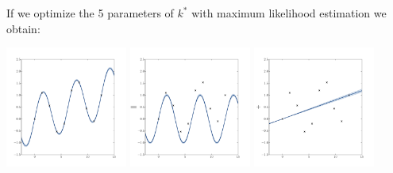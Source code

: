 \documentclass{beamer}
\begin{document}
\begin{frame}{}
If we optimize the 5 parameters of $k^*$ with maximum likelihood estimation we obtain: 
\begin{center}
 \includegraphics[height=4cm]{figures/Fig2-m-estim} \includegraphics[height=4cm]{figures/Fig2-mp-estim-top} \includegraphics[height=4cm]{figures/Fig2-ma-estim-top}
\end{center}
\end{frame}
\end{document}
